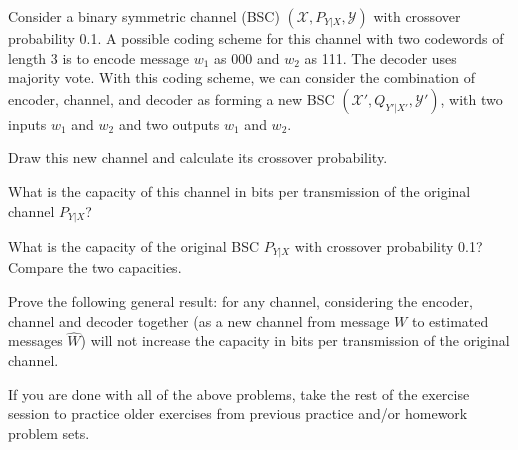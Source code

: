 \documentclass[a4paper,10pt,landscape,twocolumn]{scrartcl}
\begin{document}
\begin{exercise}
Consider a binary symmetric channel (BSC) $(\mathcal{X},P_{Y|X},\mathcal{Y})$ with crossover probability 0.1. A possible coding scheme for this channel with two codewords of length 3 is to encode message $w_1$ as 000 and $w_2$ as 111. The decoder uses majority vote. With this coding scheme, we can consider the combination of encoder, channel, and decoder as forming a new BSC $(\mathcal{X}',Q_{Y'|X'},\mathcal{Y}')$, with two inputs $w_1$ and $w_2$ and two outputs $w_1$ and $w_2$.
\begin{subex}
Draw this new channel and calculate its crossover probability.
\end{subex}
\begin{subex}
What is the capacity of this channel in bits per transmission of the original channel $P_{Y|X}$?
\end{subex}
\begin{subex}
What is the capacity of the original BSC $P_{Y|X}$ with crossover probability 0.1? Compare the two capacities.
\end{subex}
\begin{subex}
Prove the following general result: for any channel, considering the encoder, channel and decoder together (as a new channel from message $W$ to estimated messages $\hat{W}$) will not increase the capacity in bits per transmission of the original channel.
\end{subex}
\end{exercise}

\begin{exercise}[Practice!]
If you are done with all of the above problems, take the rest of the exercise session to practice older exercises from previous practice and/or homework problem sets.
\end{exercise}
\end{document}
